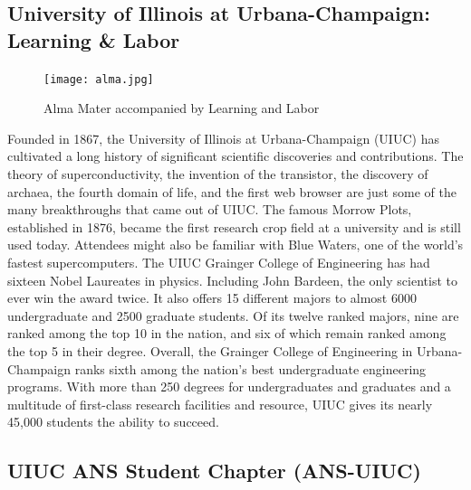 \subsection{University of Illinois at Urbana-Champaign: Learning \& Labor}
\begin{figure}
  \begin{center}
  \vspace{-\baselineskip}
    \texttt{[image: alma.jpg]}
    \caption{Alma Mater accompanied by Learning and Labor}
  \end{center}
\end{figure}
Founded in 1867, the University of Illinois at Urbana-Champaign (UIUC) has cultivated a long history of significant scientific discoveries and contributions. The theory of superconductivity, the invention of the transistor, the discovery of archaea, the fourth domain of life, and the first web browser are just some of the many breakthroughs that came out of UIUC. The famous Morrow Plots, established in 1876, became the first research crop field at a university and is still used today. Attendees might also be familiar with Blue Waters, one of the world’s fastest supercomputers. 
The UIUC Grainger College of Engineering has had sixteen Nobel Laureates in physics. Including John Bardeen, the only scientist to ever win the award twice. It also offers 15 different majors to almost 6000 undergraduate and 2500 graduate students. Of its twelve ranked majors, nine are ranked among the top 10 in the nation, and six of which remain ranked among the top 5 in their degree. Overall, the Grainger College of Engineering in Urbana-Champaign ranks sixth among the nation’s best undergraduate engineering programs. With more than 250 degrees for undergraduates and graduates and a multitude of first-class research facilities and resource, UIUC gives its nearly 45,000 students the ability to succeed. 

\subsection{UIUC ANS Student Chapter (ANS-UIUC)}

